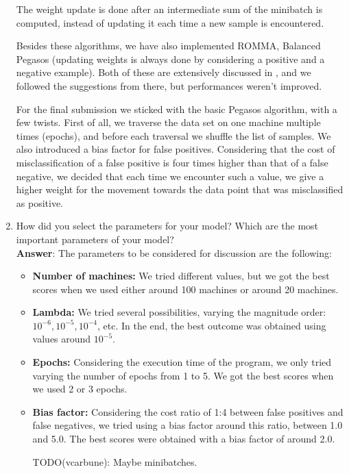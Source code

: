 \documentclass[11pt]{article}
\begin{document}
\begin{enumerate}
The weight update is done after an intermediate sum of the minibatch is
computed, instead of updating it each time a new sample is encountered.

Besides these algorithms, we have also implemented ROMMA, Balanced
Pegasos (updating weights is always done by considering a positive and a
negative example). Both of these are extensively discussed in \cite{Sculley09}, 
and we followed the suggestions from there, but performances weren't improved.

For the final submission we sticked with the basic Pegasos algorithm, with a few twists.
First of all, we traverse the data set on one machine multiple times (epochs), 
and before each traversal we shuffle the list of samples. 
We also introduced a bias factor for false positives. Considering that the cost of 
misclassification of a false positive is four times higher than that of a false negative, 
we decided that each time we encounter such a value, we give a higher weight 
for the movement towards the data point that was misclassified as positive.


\item How did you select the parameters for your model? Which are the
  most important parameters of your model? \\
  
\textbf{Answer}:  The parameters to be considered for discussion are the following:
\begin{itemize}
\item{\textbf{Number of machines:}} We tried different values, but we got the best scores 
when we used either around 100 machines or around 20 machines.
\item{\textbf{Lambda:}} We tried several possibilities, varying the
magnitude order: $10^{-6}, 10^{-5}, 10^{-4}$, etc. In the end, the best
outcome was obtained using values around $10^{-5}$.
\item{\textbf{Epochs:}} Considering the execution time of the program, we only tried 
varying the number of epochs from 1 to 5. We got the best scores when we used 2 or 3 
epochs.
\item{\textbf{Bias factor:}} Considering the cost ratio of 1:4 between false positives 
and false negatives, we tried using a bias factor around this ratio, between 1.0 and 5.0.
The best scores were obtained with a bias factor of around 2.0.


TODO(vcarbune): Maybe minibatches.

\end{itemize}

\end{enumerate}
\end{document}
